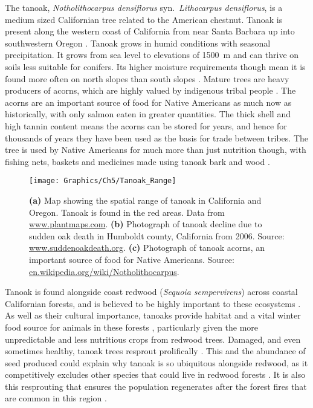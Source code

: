 The tanoak, \textit{Notholithocarpus densiflorus} syn.~\textit{Lithocarpus densiflorus}, is a medium sized Californian tree related to the American chestnut. Tanoak is present along the western coast of California from near Santa Barbara up into southwestern Oregon \citep[see Figure~\ref{fig:ch5:tanoak_range};][]{tappeiner_lithocarpus_1990}. Tanoak grows in humid conditions with seasonal precipitation. It grows from sea level to elevations of \SI{1500}{\meter} and can thrive on soils less suitable for conifers. Its higher moisture requirements though mean it is found more often on north slopes than south slopes \citep{tappeiner_lithocarpus_1990}. Mature trees are heavy producers of acorns, which are highly valued by indigenous tribal people \citep{bowcutt_tanoak_2013}. The acorns are an important source of food for Native Americans as much now as historically, with only salmon eaten in greater quantities. The thick shell and high tannin content means the acorns can be stored for years, and hence for thousands of years they have been used as the basis for trade between tribes. The tree is used by Native Americans for much more than just nutrition though, with fishing nets, baskets and medicines made using tanoak bark and wood \citep{bowcutt_tanoak_2013}.

\begin{figure}
    \begin{center}
        \texttt{[image: Graphics/Ch5/Tanoak\_Range]}
        \caption[The tanoak tree: pictures and map of spatial range]{\textbf{(a)} Map showing the spatial range of tanoak in California and Oregon. Tanoak is found in the red areas. Data from \url{www.plantmaps.com}. \textbf{(b)} Photograph of tanoak decline due to sudden oak death in Humboldt county, California from 2006. Source: \url{www.suddenoakdeath.org}. \textbf{(c)} Photograph of tanoak acorns, an important source of food for Native Americans. Source: \url{en.wikipedia.org/wiki/Notholithocarpus}. \label{fig:ch5:tanoak_range}}
    \end{center}
\end{figure}

Tanoak is found alongside coast redwood (\textit{Sequoia sempervirens}) across coastal Californian forests, and is believed to be highly important to these ecosystems \citep{noss_redwood_2000}. As well as their cultural importance, tanoaks provide habitat and a vital winter food source for animals in these forests \citep{long_recent_2018}, particularly given the more unpredictable and less nutritious crops from redwood trees. Damaged, and even sometimes healthy, tanoak trees resprout prolifically \citep{tappeiner_lithocarpus_1990}. This and the abundance of seed produced could explain why tanoak is so ubiquitous alongside redwood, as it competitively excludes other species that could live in redwood forests \citep{ramage_forest_2011}. It is also this resprouting that ensures the population regenerates after the forest fires \citep{mcdonald_california_2002} that are common in this region \citep{ramage_role_2010}.

